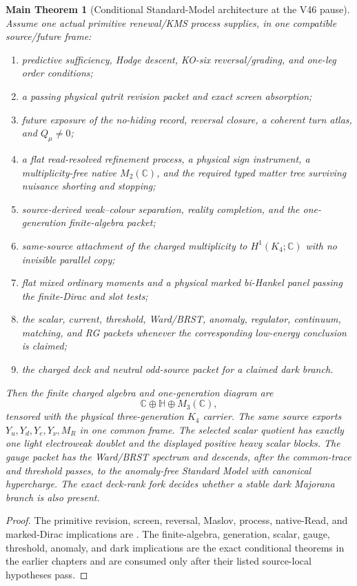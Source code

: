 \documentclass[11pt,oneside,openany]{book}
\numberwithin{equation}{chapter}
\newtheorem{maintheorem}[theorem]{Main Theorem}
\theoremstyle{definition}
\theoremstyle{remark}
\newcommand{\C}{\mathbb C}
\newcommand{\HH}{\mathbb H}
\begin{document}
\begin{maintheorem}[Conditional Standard-Model architecture at the V46 pause]
\label{thm:conditional-architecture}
Assume one actual primitive renewal/KMS process supplies, in one compatible
source/future frame:
\begin{enumerate}[label=\textup{(C\arabic*)},leftmargin=2.8em]
\item predictive sufficiency, Hodge descent, KO-six reversal/grading, and
      one-leg order conditions;
\item a passing physical qutrit revision packet and exact screen absorption;
\item future exposure of the no-hiding record, reversal closure, a coherent
      turn atlas, and \(Q_\mu\ne0\);
\item a flat read-resolved refinement process, a physical sign instrument, a
      multiplicity-free native \(M_2(\C)\), and the required typed matter tree
      surviving nuisance shorting and stopping;
\item source-derived weak--colour separation, reality completion, and the
      one-generation finite-algebra packet;
\item same-source attachment of the charged multiplicity to
      \(H^1(K_4;\C)\) with no invisible parallel copy;
\item flat mixed ordinary moments and a physical marked bi-Hankel panel passing
      the finite-Dirac and slot tests;
\item the scalar, current, threshold, Ward/BRST, anomaly, regulator, continuum,
      matching, and RG packets whenever the corresponding low-energy
      conclusion is claimed;
\item the charged deck and neutral odd-source packet for a claimed dark branch.
\end{enumerate}
Then the finite charged algebra and one-generation diagram are
\[
 \C\oplus\HH\oplus M_3(\C),
\]
tensored with the physical three-generation \(K_4\) carrier.  The same source
exports \(Y_u,Y_d,Y_e,Y_\nu,M_R\) in one common frame.  The selected scalar
quotient has exactly one light electroweak doublet and the displayed positive
heavy scalar blocks.  The gauge packet has the Ward/BRST spectrum and descends,
after the common-trace and threshold passes, to the anomaly-free Standard
Model with canonical hypercharge.  The exact deck-rank fork decides whether a
stable dark Majorana branch is also present.
\end{maintheorem}

\begin{proof}
The primitive revision, screen, reversal, Maslov, process, native-Read, and
marked-Dirac implications are
.  The finite-algebra, generation,
scalar, gauge, threshold, anomaly, and dark implications are the exact
conditional theorems in the earlier chapters and are consumed only after
their listed source-local hypotheses pass.
\end{proof}
\end{document}

